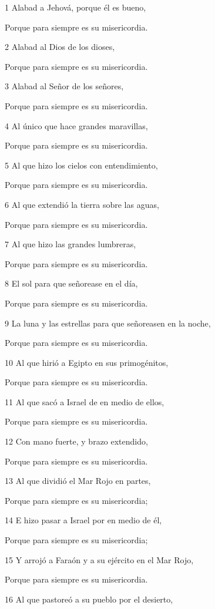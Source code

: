 \par 1 Alabad a Jehová, porque él es bueno,
\par Porque para siempre es su misericordia.
\par 2 Alabad al Dios de los dioses,
\par Porque para siempre es su misericordia.
\par 3 Alabad al Señor de los señores,
\par Porque para siempre es su misericordia.
\par 4 Al único que hace grandes maravillas,
\par Porque para siempre es su misericordia.
\par 5 Al que hizo los cielos con entendimiento,
\par Porque para siempre es su misericordia.
\par 6 Al que extendió la tierra sobre las aguas,
\par Porque para siempre es su misericordia.
\par 7 Al que hizo las grandes lumbreras,
\par Porque para siempre es su misericordia.
\par 8 El sol para que señorease en el día,
\par Porque para siempre es su misericordia.
\par 9 La luna y las estrellas para que señoreasen en la noche,
\par Porque para siempre es su misericordia.
\par 10 Al que hirió a Egipto en sus primogénitos,
\par Porque para siempre es su misericordia.
\par 11 Al que sacó a Israel de en medio de ellos,
\par Porque para siempre es su misericordia.
\par 12 Con mano fuerte, y brazo extendido,
\par Porque para siempre es su misericordia.
\par 13 Al que dividió el Mar Rojo en partes,
\par Porque para siempre es su misericordia;
\par 14 E hizo pasar a Israel por en medio de él,
\par Porque para siempre es su misericordia;
\par 15 Y arrojó a Faraón y a su ejército en el Mar Rojo,
\par Porque para siempre es su misericordia.
\par 16 Al que pastoreó a su pueblo por el desierto,
